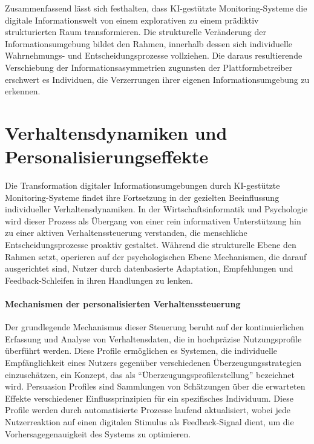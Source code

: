 Zusammenfassend lässt sich festhalten, dass \ac{KI}-gestützte Monitoring-Systeme die digitale Informationswelt von einem explorativen zu einem prädiktiv strukturierten Raum transformieren. Die strukturelle Veränderung der Informationsumgebung bildet den Rahmen, innerhalb dessen sich individuelle Wahrnehmungs- und Entscheidungsprozesse vollziehen. Die daraus resultierende Verschiebung der Informationsasymmetrien zugunsten der Plattformbetreiber erschwert es Individuen, die Verzerrungen ihrer eigenen Informationsumgebung zu erkennen.
\section{Verhaltensdynamiken und Personalisierungseffekte}

Die Transformation digitaler Informationsumgebungen durch \ac{KI}-gestützte Monitoring-Systeme findet ihre Fortsetzung in der gezielten Beeinflussung individueller Verhaltensdynamiken. In der Wirtschaftsinformatik und Psychologie wird dieser Prozess als Übergang von einer rein informativen Unterstützung hin zu einer aktiven Verhaltenssteuerung verstanden, die menschliche Entscheidungsprozesse proaktiv gestaltet. Während die strukturelle Ebene den Rahmen setzt, operieren auf der psychologischen Ebene Mechanismen, die darauf ausgerichtet sind, Nutzer durch datenbasierte Adaptation, Empfehlungen und Feedback-Schleifen in ihren Handlungen zu lenken.

\paragraph{Mechanismen der personalisierten Verhaltenssteuerung}

Der grundlegende Mechanismus dieser Steuerung beruht auf der kontinuierlichen Erfassung und Analyse von Verhaltensdaten, die in hochpräzise Nutzungsprofile überführt werden. Diese Profile ermöglichen es Systemen, die individuelle Empfänglichkeit eines Nutzers gegenüber verschiedenen Überzeugungsstrategien einzuschätzen, ein Konzept, das als \enquote{Überzeugungsprofilerstellung} bezeichnet wird. Persuasion Profiles sind Sammlungen von Schätzungen über die erwarteten Effekte verschiedener Einflussprinzipien für ein spezifisches Individuum. Diese Profile werden durch automatisierte Prozesse laufend aktualisiert, wobei jede Nutzerreaktion auf einen digitalen Stimulus als Feedback-Signal dient, um die Vorhersagegenauigkeit des Systems zu optimieren.

